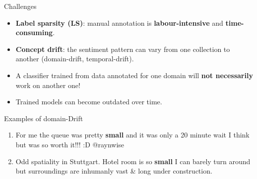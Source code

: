 \documentclass[handout]{beamer}
\begin{document}
%
%
%
%  
%
%




\begin{frame}{Challenges}
\begin{scriptsize}

\begin{itemize}  
\item \textbf{Label sparsity (LS)}: manual annotation is \textbf{labour-intensive} and \textbf{time-consuming}. 
\item \textbf{Concept drift}: the sentiment pattern can vary from one collection to another (domain-drift, temporal-drift).
 
\item A classifier trained from data annotated for one domain will \textbf{not necessarily} work on another one! 
\item Trained models can become outdated over time.
\end{itemize} 
  
  
\begin{block}{Examples of domain-Drift}
\begin{enumerate}
\item  For me the queue was pretty \textcolor[rgb]{0.00,0.00,1.00}{\textbf{small}} and it was only a 20 minute wait I think but was so worth it!!! :D @raynwise
\item Odd spatiality in Stuttgart. Hotel room is so  \textcolor[rgb]{1.00,0.00,0.00}{\textbf{small}} I can barely turn around but surroundings are inhumanly vast \& long under construction.
\end{enumerate}
\end{block}


\end{scriptsize}

\end{frame}
\end{document}
